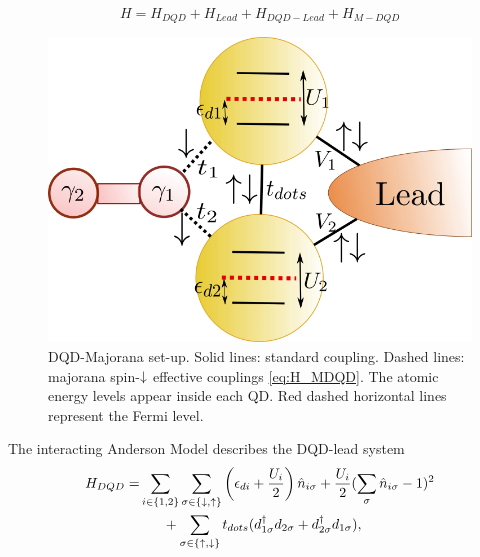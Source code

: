 \documentclass[showpacs,aps,prb,reprint,superscriptaddress]{revtex4-1}
\begin{document}
\begin{equation}
H=H_{DQD}+H_{Lead}+H_{DQD-Lead}+H_{M-DQD} 
\label{eq:Model}
\end{equation}


\begin{figure}[bt]
\begin{center}
\includegraphics[scale=0.4]{Graficos/GenModel.png}
\caption{ DQD-Majorana set-up. Solid lines: standard coupling. Dashed lines: majorana spin-$\downarrow$ effective couplings \eqref{eq:H_MDQD}. The atomic energy levels appear inside each QD. Red dashed horizontal lines represent the Fermi level.  
}
%
\label{fig:GenModel}
\end{center}
\end{figure}


%





The interacting Anderson Model describes the DQD-lead system  
\begin{align}
\begin{split}
    H_{DQD}=&  \sum_{i\in\{1,2\}} \sum_{\sigma\in \{ \downarrow , \uparrow\}}  \left(\epsilon_{di}+\frac{U_i}{2}\right)\hat{n}_{i\sigma}+ \frac{U_i}{2}(\sum_{\sigma} \hat{n}_{i\sigma}-1)^{2} \\ 
&\ \ \ \ \ + \sum_{\sigma \in \{\uparrow , \downarrow\}} t_{dots}(d^{\dagger}_{1\sigma}  d_{2\sigma}+d^{\dagger}_{2\sigma}  d_{1\sigma}), \label{eq:H_DQD}
\end{split}
\end{align}
\end{document}
